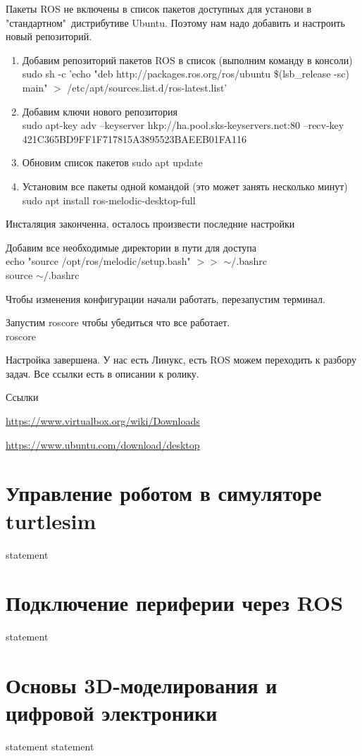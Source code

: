 Пакеты ROS не включены в список пакетов доступных для установи в "стандартном"\ дистрибутиве Ubuntu. Поэтому нам надо добавить и настроить новый репозиторий.
\begin{enumerate}
    \item Добавим репозиторий пакетов ROS в список (выполним команду в консоли)\\
    sudo sh -c 'echo "deb http://packages.ros.org/ros/ubuntu \$(lsb\_release -sc) main" $>$ /etc/apt/sources.list.d/ros-latest.list'
    \item Добавим ключи нового репозитория\\
    sudo apt-key adv --keyserver hkp://ha.pool.sks-keyservers.net:80 --recv-key \\ 421C365BD9FF1F717815A3895523BAEEB01FA116
    \item Обновим список пакетов
    sudo apt update
    \item Установим все пакеты одной командой (это может занять несколько минут)\\
    sudo apt install ros-melodic-desktop-full
\end{enumerate}

Инсталяция законченна, осталось произвести последние настройки

Добавим все необходимые директории в пути для доступа\\
echo "source /opt/ros/melodic/setup.bash" $>>$ $\sim$/.bashrc\\
source $\sim$/.bashrc

Чтобы изменения конфигурации начали работать, перезапустим терминал.

Запустим roscore чтобы убедиться что все работает.\\
roscore

Настройка завершена. У нас есть Линукс, есть ROS можем переходить к разбору задач.
Все ссылки есть в описании к ролику.

Ссылки

\url{https://www.virtualbox.org/wiki/Downloads}

\url{https://www.ubuntu.com/download/desktop}

\section{Управление роботом в симуляторе turtlesim}

{statement}

\section{Подключение периферии через ROS}

{statement}

\section{Основы 3D-моделирования и цифровой электроники}

{statement}
{statement}



